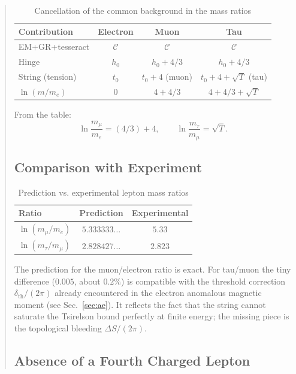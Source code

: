\documentclass[12pt]{article}
\begin{document}
\begin{abstract}
\begin{table}[h]
\centering
\caption{Cancellation of the common background in the mass ratios}
\label{tab:lepton_cancellation}
\begin{tabular}{lccc}
\toprule
\textbf{Contribution} & \textbf{Electron} & \textbf{Muon} & \textbf{Tau} \\
\midrule
EM+GR+tesseract & \(\mathcal{C}\) & \(\mathcal{C}\) & \(\mathcal{C}\) \\
Hinge & \(h_0\) & \(h_0 + 4/3\) & \(h_0 + 4/3\) \\
String (tension) & \(t_0\) & \(t_0 + 4\) (muon) & \(t_0 + 4 + \sqrt{T}\) (tau) \\
\hline
\(\ln(m/m_e)\) & \(0\) & \(4 + 4/3\) & \(4 + 4/3 + \sqrt{T}\) \\
\hline
\end{tabular}
\end{table}

From the table:
\[
\ln\frac{m_\mu}{m_e} = (4/3) + 4,\qquad
\ln\frac{m_\tau}{m_\mu} = \sqrt{T}.
\]

\subsection{Comparison with Experiment}

\begin{table}[h]
\centering
\caption{Prediction vs. experimental lepton mass ratios}
\label{tab:lepton_comparison}
\begin{tabular}{lcc}
\toprule
\textbf{Ratio} & \textbf{Prediction} & \textbf{Experimental} \\
\midrule
\(\ln(m_\mu/m_e)\) & \(5.333333\ldots\) & \(5.33\) \\
\(\ln(m_\tau/m_\mu)\) & \(2.828427\ldots\) & \(2.823\) \\
\hline
\end{tabular}
\end{table}

The prediction for the muon/electron ratio is exact. For tau/muon the tiny difference (\(0.005\), about \(0.2\%\)) is compatible with the threshold correction \(\delta_{\text{th}}/(2\pi)\) already encountered in the electron anomalous magnetic moment (see Sec.~\ref{sec:ae}). It reflects the fact that the string cannot saturate the Tsirelson bound perfectly at finite energy; the missing piece is the topological bleeding \(\Delta S/(2\pi)\).

\subsection{Absence of a Fourth Charged Lepton}


\end{abstract}
\end{document}
